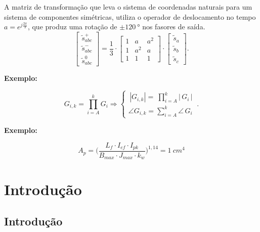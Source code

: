 A matriz de transformação que leva o sistema de coordenadas naturais para um sistema de componentes simétricas, utiliza o operador de deslocamento no tempo $a=e^{j\frac{2\pi}{3}}$, que produz uma rotação de $\pm \SI{120}{\degree}$ nos fasores de saída.
\begin{equation}
\begin{bmatrix}
	\tilde{s}_{abc}^+ \\[0.5em]
	\tilde{s}_{abc}^- \\[0.5em]
	\tilde{s}_{abc}^0 
\end{bmatrix}
= \frac{1}{3} \cdot
\begin{bmatrix}
	1 & a   & a^2 	\\
	1 & a^2 & a 	\\
	1 & 1 	& 1 
\end{bmatrix}
\cdot
\begin{bmatrix}
	\tilde{s}_a \\[0.5em]
	\tilde{s}_b \\[0.5em]
	\tilde{s}_c 
\end{bmatrix} .
\end{equation}


\textbf{Exemplo:}

\begin{equation} \label{eq:valor_final}
G_{i,k} = \prod_{i=A}^{k} G_i \Rightarrow 
\begin{cases}
\, \left| G_{i,k}  \right| =\   \displaystyle	 \prod_{i=A}^{k}  \big|\, G_i \, \big| \\[1.5em]
\angle G_{i,k}   =  \displaystyle\sum_{i=A}^{k}  \angle\, G_i\ 
\end{cases}.
\end{equation}

\textbf{Exemplo:}

\begin{equation}
A_p = 	\bigg(\frac{L_f\cdot I_{ef}\cdot I_{pk}}{B_{max}\cdot  J_{max}\cdot k_w}\bigg)^{1{,}14} = \SI{1}{cm^4}
\end{equation}









\chapter{Introdução}

\section{Introdução}

